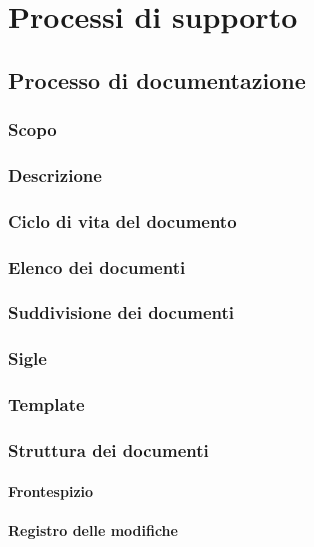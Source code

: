 \section{Processi di supporto}
\subsection{Processo di documentazione}
\subsubsection{Scopo}

\subsubsection{Descrizione}

\subsubsection{Ciclo di vita del documento}

\subsubsection{Elenco dei documenti}

\subsubsection{Suddivisione dei documenti}

\subsubsection{Sigle}

\subsubsection{Template}

\subsubsection{Struttura dei documenti}
\paragraph{Frontespizio} 

\paragraph{Registro delle modifiche} 


